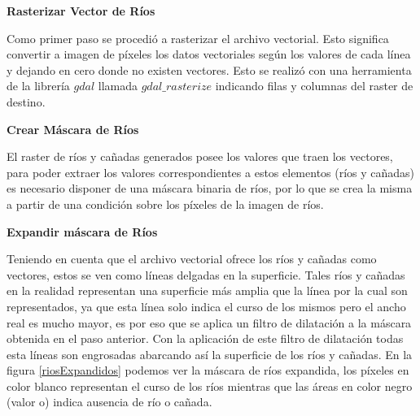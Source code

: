 \documentclass[10pt,a4paper, twoside]{report}
\begin{document}
\textbf{Rasterizar Vector de Ríos}

Como primer paso se procedió a rasterizar el archivo vectorial. Esto significa convertir a imagen de píxeles los datos vectoriales según los valores de cada línea y dejando en cero donde no existen vectores. Esto se realizó con una herramienta de la librería $gdal$ llamada $gdal\_rasterize$ indicando filas y columnas del raster de destino.



\textbf{Crear Máscara de Ríos}

El raster de ríos y cañadas generados posee los valores que traen los vectores, para poder extraer los valores correspondientes a estos elementos (ríos y cañadas) es necesario disponer de una máscara binaria de ríos, por lo que se crea la misma a partir de una condición sobre los píxeles de la imagen de ríos. %


\textbf{Expandir máscara de Ríos}
\label{expansionRios}

Teniendo en cuenta que el archivo vectorial ofrece los ríos y cañadas como vectores, estos se ven como líneas delgadas en la superficie. Tales ríos y cañadas en la realidad representan una superficie más amplia que la línea por la cual son representados, ya que esta línea solo indica el curso de los mismos pero el ancho real es mucho mayor, es por eso que se aplica un filtro de dilatación a la máscara obtenida en el paso anterior. Con la aplicación de este filtro de dilatación todas esta líneas son engrosadas abarcando así la superficie de los ríos y cañadas. En la figura \ref{riosExpandidos} podemos ver la máscara de ríos expandida, los píxeles en color blanco representan el curso de los ríos mientras que las áreas en color negro (valor o) indica ausencia de río o cañada.
\end{document}
